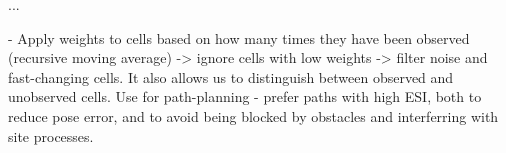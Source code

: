 ...

- Apply weights to cells based on how many times they have been observed (recursive moving average) -> ignore cells with low weights -> filter noise and fast-changing cells. 
It also allows us to distinguish between observed and unobserved cells. 
Use for path-planning - prefer paths with high ESI, both to reduce pose error, and to avoid being blocked by obstacles and interferring with site processes. 
